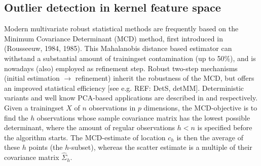 \documentclass[preprint,12pt]{elsarticle}
\begin{document}
%	
	
	\subsection{Outlier detection in kernel feature space}
	 Modern multivariate robust statistical methods are frequently based on the Minimum Covariance Determinant (MCD) method, first introduced in  (Rousseeuw, 1984, 1985). This Mahalanobis distance based estimator can withstand a substantial amount of trainingset contamination (up to 50\%), and is nowadays (also) employed as refinement step. Robust two-step mechanisms (initial estimation $\rightarrow$ refinement) inherit the robustness of the MCD, but offers an improved statistical efficiency [see e.g. REF: DetS, detMM]. Deterministic variants and well know PCA-based applications are described in \cite{hubert2012deterministic} and \cite{hubert2005robpca} respectively. \\
	
	Given a trainingset $X$ of $n$ observations in $p$ dimensions, the MCD-objective is to find the $h$ observations whose sample covariance matrix has the lowest possible determinant, where the amount of regular observations $h < n$ is specified before the algorithm starts. The MCD-estimate of location $c_h$ is then the average of these $h$ points (the $h$-subset), whereas the scatter estimate is a multiple of their covariance matrix $\hat{\Sigma}_{h}$. 
	
\end{document}
